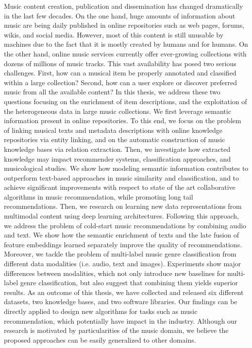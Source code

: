 Music content creation, publication and dissemination has changed dramatically in the last few decades. On the one hand, huge amounts of information about music are being daily published in online repositories such as web pages, forums, wikis, and social media. However, most of this content is still unusable by machines due to the fact that it is mostly created by humans and for humans. On the other hand, online music services currently offer ever-growing collections with dozens of millions of music tracks. This vast availability has posed two serious challenges. First, how can a musical item be properly annotated and classified within a large collection? Second, how can a user explore or discover preferred music from all the available content? In this thesis, we address these two questions focusing on the enrichment of item descriptions, and the exploitation of the heterogeneous data in large music collections. We first leverage semantic information present in online repositories. To this end, we focus on the problem of linking musical texts and metadata descriptions with online knowledge repositories via entity linking, and on the automatic construction of music knowledge bases via relation extraction. Then, we investigate how extracted knowledge may impact recommender systems, classification approaches, and musicological studies. We show how modeling semantic information contributes to outperform text-based approaches in music similarity and classification, and to achieve significant improvements with respect to state of the art collaborative algorithms in music recommendation, while promoting long tail recommendations. Then, we research on learning new data representations from multimodal content using deep learning architectures. Following this approach, we address the problem of cold-start music recommendations by combining audio and text. We show how the semantic enrichment of texts and the late fusion of feature embeddings learned separately improve the quality of recommendations. Moreover, we tackle the problem of multi-label music genre classification from different data modalities (i.e. audio, text and images). Experiments show major differences between modalities, which not only introduce new baselines for multi-label genre classification, but also suggest that combining them yields superior results. As an outcome of this thesis, we have collected and released six different datasets, two knowledge bases, and two software libraries. Our findings can be directly applied to design new algorithms for tasks such as music recommendation, which potentially have impact in the industry. Although our research is motivated by particularities of the music domain, we believe the proposed approaches can be easily generalized to other domains.
